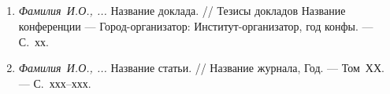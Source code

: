 \newpage
\subsection*{}
\begin{enumerate}
 \item \emph{Фамилия~И.О., ...} Название доклада. // Тезисы докладов Название конференции --- Город-организатор: Институт-организатор, год конфы. --- С.~хх.

 \item \emph{Фамилия~И.О., ...} Название статьи. // Название журнала, Год. --- Том~ХХ. --- С.~ххх--ххх.
\end{enumerate}